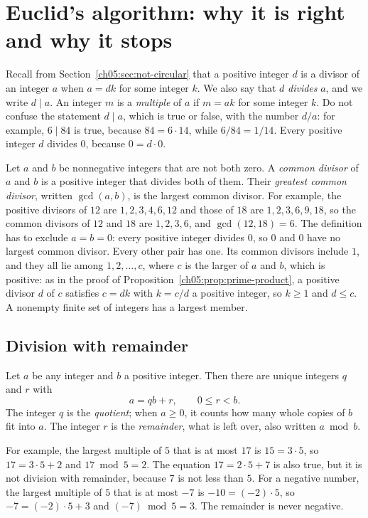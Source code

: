 \section{Euclid's algorithm: why it is right and why it stops}\label{ch05:sec:euclid}
Recall from Section~\ref{ch05:sec:not-circular} that a positive integer $d$ is a divisor of an integer $a$ when $a=dk$ for some integer $k$. We also say that $d$ \emph{divides} $a$, and we write $d\mid a$. An integer $m$ is a \emph{multiple} of $a$ if $m=ak$ for some integer $k$. Do not confuse the statement $d\mid a$, which is true or false, with the number $d/a$: for example, $6\mid84$ is true, because $84=6\cdot14$, while $6/84=1/14$. Every positive integer $d$ divides $0$, because $0=d\cdot0$.

Let $a$ and $b$ be nonnegative integers that are not both zero. A \emph{common divisor} of $a$ and $b$ is a positive integer that divides both of them. Their \emph{greatest common divisor}, written $\gcd(a,b)$, is the largest common divisor. For example, the positive divisors of $12$ are $1,2,3,4,6,12$ and those of $18$ are $1,2,3,6,9,18$, so the common divisors of $12$ and $18$ are $1,2,3,6$, and $\gcd(12,18)=6$. The definition has to exclude $a=b=0$: every positive integer divides $0$, so $0$ and $0$ have no largest common divisor. Every other pair has one. Its common divisors include $1$, and they all lie among $1,2,\ldots,c$, where $c$ is the larger of $a$ and $b$, which is positive: as in the proof of Proposition~\ref{ch05:prop:prime-product}, a positive divisor $d$ of $c$ satisfies $c=dk$ with $k=c/d$ a positive integer, so $k\ge1$ and $d\le c$. A nonempty finite set of integers has a largest member.

\subsection*{Division with remainder}
Let $a$ be any integer and $b$ a positive integer. Then there are unique integers $q$ and $r$ with
\[
a=qb+r,\qquad 0\le r<b.
\]
The integer $q$ is the \emph{quotient}; when $a\ge0$, it counts how many whole copies of $b$ fit into $a$. The integer $r$ is the \emph{remainder}, what is left over, also written $a\bmod b$.

For example, the largest multiple of $5$ that is at most $17$ is $15=3\cdot5$, so $17=3\cdot5+2$ and $17\bmod5=2$. The equation $17=2\cdot5+7$ is also true, but it is not division with remainder, because $7$ is not less than $5$. For a negative number, the largest multiple of $5$ that is at most $-7$ is $-10=(-2)\cdot5$, so $-7=(-2)\cdot5+3$ and $(-7)\bmod5=3$. The remainder is never negative.

